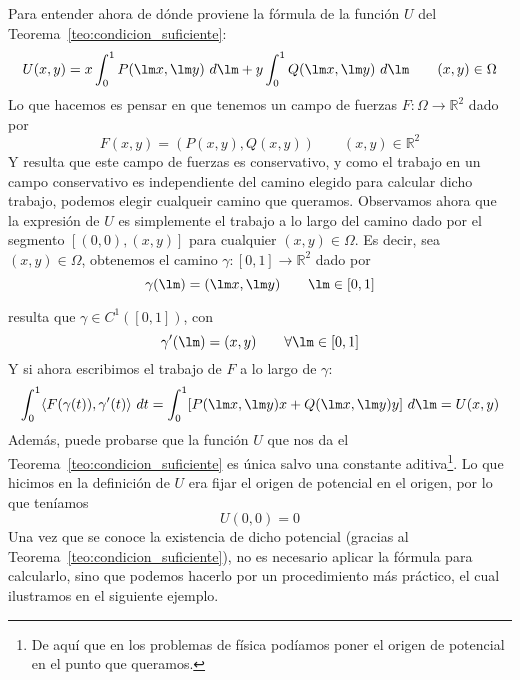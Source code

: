 \noindent
Para entender ahora de dónde proviene la fórmula de la función $U$ del Teorema~\ref{teo:condicion_suficiente}:
\begin{equation*}
    U(x,y) = x\int_{0}^{1} P(\lm x,\lm y)~d\lm + y\int_{0}^{1} Q(\lm x,\lm y)~d\lm  \qquad (x,y)\in \Omega
\end{equation*}
Lo que hacemos es pensar en que tenemos un campo de fuerzas $F:\Omega\rightarrow\mathbb{R}^2$ dado por
\begin{equation*}
    F(x,y) = (P(x,y),Q(x,y)) \qquad (x,y)\in \mathbb{R}^2
\end{equation*}
Y resulta que este campo de fuerzas es conservativo, y como el trabajo en un campo conservativo es independiente del camino elegido para calcular dicho trabajo, podemos elegir cualqueir camino que queramos. Observamos ahora que la expresión de $U$ es simplemente el trabajo a lo largo del camino dado por el segmento $[(0,0),(x,y)]$ para cualquier $(x,y)\in \Omega$. Es decir, sea $(x,y)\in \Omega$, obtenemos el camino $\gamma:[0,1]\rightarrow\mathbb{R}^2$ dado por
\begin{equation*}
    \gamma(\lm) = (\lm x,\lm y) \qquad \lm \in [0,1]
\end{equation*}

resulta que $\gamma\in C^1([0,1])$, con
\begin{equation*}
    \gamma'(\lm) = (x,y) \qquad \forall \lm\in [0,1]
\end{equation*}
Y si ahora escribimos el trabajo de $F$ a lo largo de $\gamma$:
\begin{equation*}
    \int_{0}^{1} \langle F(\gamma(t)),\gamma'(t) \rangle~dt = \int_{0}^{1} [P(\lm x,\lm y)x+Q(\lm x,\lm y)y]~d\lm  = U(x,y)
\end{equation*}
Además, puede probarse que la función $U$ que nos da el Teorema~\ref{teo:condicion_suficiente} es única salvo una constante aditiva\footnote{De aquí que en los problemas de física podíamos poner el origen de potencial en el punto que queramos.}. Lo que hicimos en la definición de $U$ era fijar el origen de potencial en el origen, por lo que teníamos
\begin{equation*}
    U(0,0) = 0
\end{equation*}
Una vez que se conoce la existencia de dicho potencial (gracias al Teorema~\ref{teo:condicion_suficiente}), no es necesario aplicar la fórmula para calcularlo, sino que podemos hacerlo por un procedimiento más práctico, el cual ilustramos en el siguiente ejemplo.

